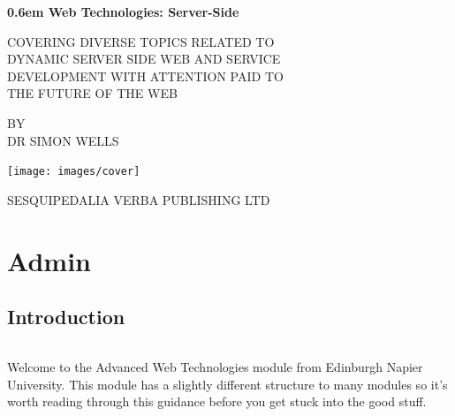 \documentclass[12pt, a4paper, oneside]{book}
\begin{document}
\clearpage
\newcommand\nbvspace[1][3]{\vspace*{\stretch{#1}}}
\newcommand\nbstretchyspace{\spaceskip0.5em plus 0.25em minus 0.25em}
\newcommand{\nbtitlestretch}{\spaceskip0.6em}
\pagestyle{empty}
\begin{center}
\bfseries
\nbvspace[1]
\Huge
{\nbtitlestretch\huge
Web Technologies: Server-Side}

\nbvspace[1]
\normalsize

COVERING DIVERSE TOPICS RELATED TO \\
DYNAMIC SERVER SIDE WEB AND SERVICE \\ 
DEVELOPMENT WITH ATTENTION PAID TO \\
THE FUTURE OF THE WEB

\nbvspace[1]
\small BY\\
\Large DR SIMON WELLS\\[0.5em]

\nbvspace[2]

\texttt{[image: images/cover]}
\nbvspace[3]
\normalsize

\large
SESQUIPEDALIA VERBA PUBLISHING LTD
\nbvspace[1]
\end{center}

\setcounter{tocdepth}{2}
\cleardoublepage
\tableofcontents
\listoffigures
{}

\mainmatter





\part{Admin}

\chapter{Introduction}
\label{intro}

\paragraph{} Welcome to the Advanced Web Technologies module from Edinburgh Napier University. This module has a slightly different structure to many modules so it's worth reading through this guidance before you get stuck into the good stuff.
\end{document}
